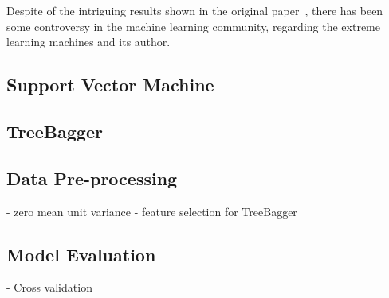 Despite of the intriguing results shown in the original paper~\cite{huang:2006:elm}, there has been some controversy in the machine learning community, regarding the extreme learning machines and its author.~\cite{reddit:2015:elm-controversy}

\subsection{Support Vector Machine}
\subsection{TreeBagger}

\subsection{Data Pre-processing}
  - zero mean unit variance
  - feature selection for TreeBagger

\subsection{Model Evaluation}
  - Cross validation

